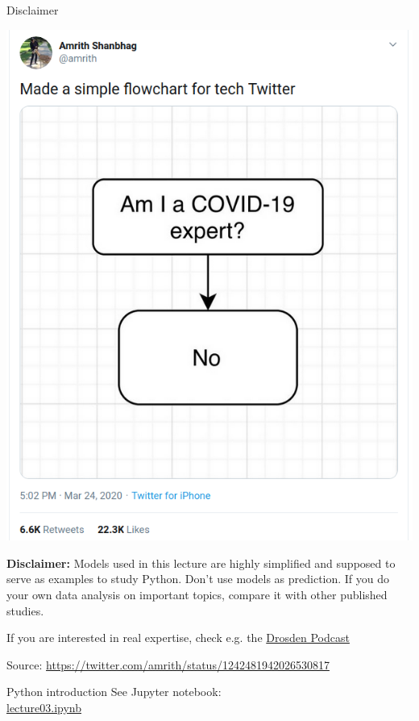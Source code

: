 \begin{frame}[fragile]{Disclaimer}
	\begin{center}
		\includegraphics[height=0.6\textheight]{covid-19-expert.png}
	\end{center}

	\pause
	\textbf{Disclaimer:} Models used in this lecture are highly simplified and supposed to serve as examples
	to study Python. Don't use models as prediction. If you do your own data analysis on important
	topics, compare it with other published studies.

	If you are interested in real expertise, check e.g. the \href{https://www.ndr.de/nachrichten/info/Corona-Podcast-Alle-Folgen-in-der-Uebersicht,podcastcoronavirus134.html}{Drosden Podcast}


	{\tiny Source: \href{https://twitter.com/amrith/status/1242481942026530817}{https://twitter.com/amrith/status/1242481942026530817}}
\end{frame}

\begin{frame}[fragile]{Python introduction}
    See Jupyter notebook:\\
    \href{https://github.com/inwe-boku/lecture-scientific-computing/blob/master/lecture03-python-introduction/lecture03.ipynb}{lecture03.ipynb}
\end{frame}


